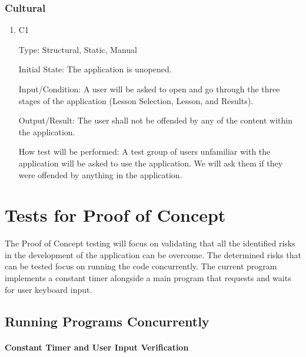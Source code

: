 \documentclass[12pt, titlepage]{article}
\begin{document}
\subsubsection{Cultural}
\begin{enumerate}

\item{{\color{cyan}C1}\\}

Type: Structural, Static, Manual
					
Initial State: The application is unopened.
					
Input/Condition: A user will be asked to open and go through the three stages of the application (Lesson Selection, Lesson, and Results).
					
Output/Result: The user shall not be offended by any of the content within the application.
					
How test will be performed: A test group of users unfamiliar with the application will be asked to use the application. {\color{cyan} We will ask them if they were offended by anything in the application.}
\end{enumerate}

\section{Tests for Proof of Concept}

The Proof of Concept testing will focus on validating that all the identified risks in the development of the application can be overcome. The determined risks that can be tested focus on running the code concurrently. The current program implements a constant timer alongside a main program that requests and waits for user keyboard input. 

\subsection{Running Programs Concurrently}
		
\paragraph{Constant Timer and User Input Verification}
\end{document}
